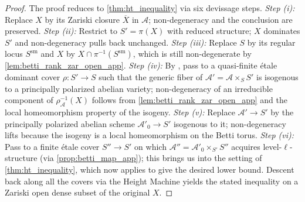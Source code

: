 \begin{proof}
  The proof reduces to \cref{thm:ht_inequality} via six devissage steps.
  \textit{Step (i):} Replace \(X\) by its Zariski closure \(\overline{X}\) in \(\mathcal{A}\);
  non-degeneracy and the conclusion are preserved.
  \textit{Step (ii):} Restrict to \(S' = \pi(X)\) with reduced structure; \(X\) dominates \(S'\)
  and non-degeneracy pulls back unchanged.
  \textit{Step (iii):} Replace \(S\) by its regular locus \(S^{\mathrm{sm}}\) and \(X\) by
  \(X \cap \pi^{-1}(S^{\mathrm{sm}})\), which is still non-degenerate by \cref{lem:betti_rank_zar_open_app}.
  \textit{Step (iv):} By \cite[Section~23, Corollary~1]{MumfordAbVar}, pass to a
  quasi-finite étale dominant cover \(\rho \colon S' \to S\) such that the generic fiber of
  \(\mathcal{A}' = \mathcal{A} \times_S S'\) is isogenous to a principally polarized abelian variety;
  non-degeneracy of an irreducible component of \(\rho_{\mathcal{A}}^{-1}(X)\) follows from
  \cref{lem:betti_rank_zar_open_app} and the local homeomorphism property of the isogeny.
  \textit{Step (v):} Replace \(\mathcal{A}' \to S'\) by the principally polarized abelian scheme
  \(\mathcal{A}'_0 \to S'\) isogenous to it; non-degeneracy lifts because the isogeny is
  a local homeomorphism on the Betti torus.
  \textit{Step (vi):} Pass to a finite étale cover \(S'' \to S'\) on which \(\mathcal{A}'' = \mathcal{A}'_0 \times_{S'} S''\)
  acquires level-\(\ell\)-structure (via \cref{prop:betti_map_app}); this brings us into
  the setting of \cref{thm:ht_inequality}, which now applies to give the desired lower bound.
  Descent back along all the covers via the Height Machine yields the stated inequality on a
  Zariski open dense subset of the original \(X\).
\end{proof}
